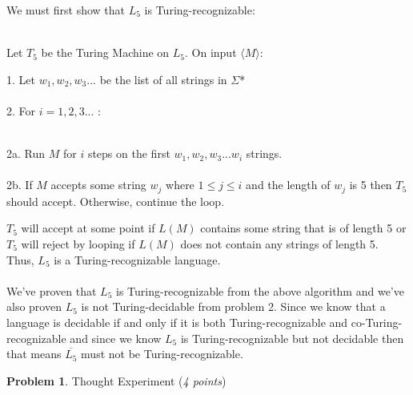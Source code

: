 \documentclass[11pt]{article}
\theoremstyle{definition}
\theoremstyle{theorem}
\newtheorem{prob}{Problem}
\begin{document}
\noindent We must first show that $L_{5}$ is Turing-recognizable: \\~\\
\hspace*{0.9cm}
\begin{minipage}{1.8\textwidth}
Let $T_{5}$ be the Turing Machine on $L_{5}$. On input $\langle M \rangle$: \\
\hspace*{1.2cm}
\begin{minipage}{1.8\textwidth}
\vspace*{0.5cm}
1. Let $w_{1}, w_{2}, w_{3} ...$ be the list of all strings in $\Sigma$* \\~\\
2. For $i = 1, 2, 3...$ : \\~\\
	\hspace*{0.8cm}
	\begin{minipage}{0.75\textwidth}
	2a. Run $M$ for $i$ steps on the first $w_{1}, w_{2}, w_{3} ... w_{i}$ strings. \\~\\
	2b. If $M$ accepts some string $w_{j}$ where $1 \leq j \leq i$ and the length of $w_{j}$ is 5 then $T_{5}$\\ 
		should accept. Otherwise, continue the loop. \\ 
	\vspace*{0.5cm}	
	\end{minipage}
\end{minipage}
\end{minipage}

\noindent$T_{5}$ will accept at some point if $L(M)$ contains some string that is of length 5 or $T_{5}$ will reject by looping if $L(M)$ does not contain any strings of length 5. Thus, $L_{5}$ is a Turing-recognizable language. \\~\\
We've proven that $L_{5}$ is Turing-recognizable from the above algorithm and we've also proven $L_{5}$ is not Turing-decidable from problem 2. Since we know that a language is decidable if and only if it is both Turing-recognizable and co-Turing-recognizable and since we know $L_{5}$ is Turing-recognizable but not decidable then that means $\overline{L_{5}}$ must not be Turing-recognizable.



\newpage

\begin{prob} Thought Experiment (\emph{4 points})\end{prob}
\end{document}
